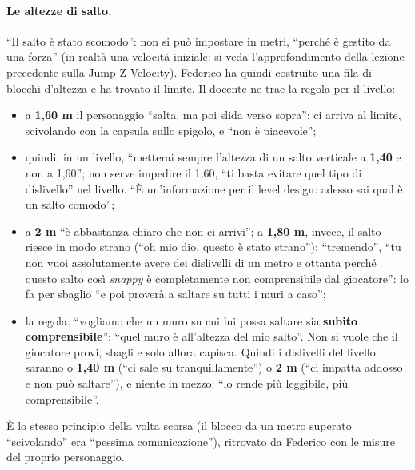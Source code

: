 \paragraph{Le altezze di salto.} ``Il salto è stato scomodo'': non si può impostare in
metri, ``perché è gestito da una forza'' (in realtà una velocità iniziale: si veda
l'approfondimento della lezione precedente sulla Jump Z Velocity). Federico ha quindi
costruito una fila di blocchi d'altezza e ha trovato il limite. Il docente ne trae la
regola per il livello:
\begin{itemize}
  \item a \textbf{1,60 m} il personaggio ``salta, ma poi slida verso sopra'': ci arriva al
        limite, scivolando con la capsula sullo spigolo, e ``non è piacevole'';
  \item quindi, in un livello, ``metterai sempre l'altezza di un salto verticale a
        \textbf{1,40} e non a 1,60''; non serve impedire il 1,60, ``ti basta evitare quel
        tipo di dislivello'' nel livello. ``È un'informazione per il level design: adesso
        sai qual è un salto comodo'';
  \item a \textbf{2 m} ``è abbastanza chiaro che non ci arrivi''; a \textbf{1,80 m}, invece,
        il salto riesce in modo strano (``oh mio dio, questo è stato strano''): ``tremendo'',
        ``tu non vuoi assolutamente avere dei dislivelli di un metro e ottanta perché questo
        salto così \emph{snappy} è completamente non comprensibile dal giocatore'': lo fa per
        sbaglio ``e poi proverà a saltare su tutti i muri a caso'';
  \item la regola: ``vogliamo che un muro su cui lui possa saltare sia \textbf{subito
        comprensibile}'': ``quel muro è all'altezza del mio salto''. Non si vuole che il
        giocatore provi, sbagli e solo allora capisca. Quindi i dislivelli del livello
        saranno o \textbf{1,40 m} (``ci sale su tranquillamente'') o \textbf{2 m} (``ci impatta
        addosso e non può saltare''), e niente in mezzo: ``lo rende più leggibile, più
        comprensibile''.
\end{itemize}
È lo stesso principio della volta scorsa (il blocco da un metro superato ``scivolando'' era
``pessima comunicazione''), ritrovato da Federico con le misure del proprio personaggio.

